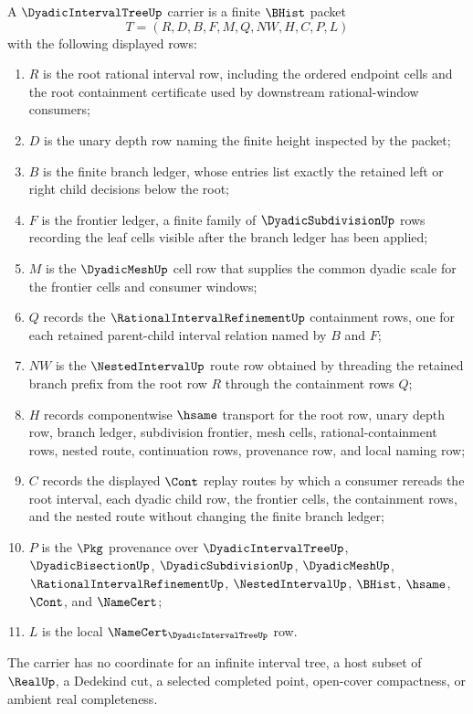 \begin{definition}
\label{def:dyadic-interval-tree-carrier}
A $\DyadicIntervalTreeUp$ carrier is a finite $\BHist$ packet
$$
T=(R,D,B,F,M,Q,NW,H,C,P,L)
$$
with the following displayed rows:
\begin{enumerate}
\item $R$ is the root rational interval row, including the ordered endpoint cells and the root containment certificate used by downstream rational-window consumers;
\item $D$ is the unary depth row naming the finite height inspected by the packet;
\item $B$ is the finite branch ledger, whose entries list exactly the retained left or right child decisions below the root;
\item $F$ is the frontier ledger, a finite family of $\DyadicSubdivisionUp$ rows recording the leaf cells visible after the branch ledger has been applied;
\item $M$ is the $\DyadicMeshUp$ cell row that supplies the common dyadic scale for the frontier cells and consumer windows;
\item $Q$ records the $\RationalIntervalRefinementUp$ containment rows, one for each retained parent-child interval relation named by $B$ and $F$;
\item $NW$ is the $\NestedIntervalUp$ route row obtained by threading the retained branch prefix from the root row $R$ through the containment rows $Q$;
\item $H$ records componentwise $\hsame$ transport for the root row, unary depth row, branch ledger, subdivision frontier, mesh cells, rational-containment rows, nested route, continuation rows, provenance row, and local naming row;
\item $C$ records the displayed $\Cont$ replay routes by which a consumer rereads the root interval, each dyadic child row, the frontier cells, the containment rows, and the nested route without changing the finite branch ledger;
\item $P$ is the $\Pkg$ provenance over $\DyadicIntervalTreeUp$, $\DyadicBisectionUp$, $\DyadicSubdivisionUp$, $\DyadicMeshUp$, $\RationalIntervalRefinementUp$, $\NestedIntervalUp$, $\BHist$, $\hsame$, $\Cont$, and $\NameCert$;
\item $L$ is the local $\NameCert_{\DyadicIntervalTreeUp}$ row.
\end{enumerate}
The carrier has no coordinate for an infinite interval tree, a host subset of $\RealUp$, a Dedekind cut, a selected completed point, open-cover compactness, or ambient real completeness.
\end{definition}

